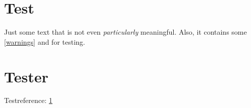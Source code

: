 \documentclass[a4paper,fleqn]{article}
\begin{document}
\tableofcontents

\section{Test}
\label{sec:test}
Just some text that is not even \emph{particularly} meaningful.
Also, it contains some \ref{warnings} and \errors for testing.

\section{Tester}
Testreference: \ref{sec:test}
\end{document}
